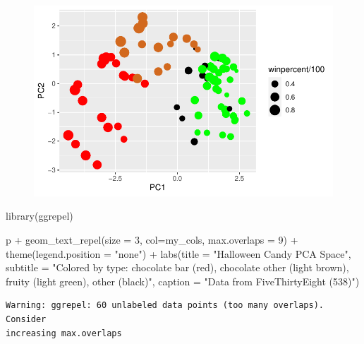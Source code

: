 \documentclass[
  letterpaper,
  DIV=11,
  numbers=noendperiod]{scrartcl}
\newenvironment{Shaded}{\begin{snugshade}}{\end{snugshade}}
\newcommand{\AttributeTok}[1]{\textcolor[rgb]{0.40,0.45,0.13}{#1}}
\newcommand{\DecValTok}[1]{\textcolor[rgb]{0.68,0.00,0.00}{#1}}
\newcommand{\FunctionTok}[1]{\textcolor[rgb]{0.28,0.35,0.67}{#1}}
\newcommand{\NormalTok}[1]{\textcolor[rgb]{0.00,0.23,0.31}{#1}}
\newcommand{\SpecialCharTok}[1]{\textcolor[rgb]{0.37,0.37,0.37}{#1}}
\newcommand{\StringTok}[1]{\textcolor[rgb]{0.13,0.47,0.30}{#1}}
\begin{document}
\begin{figure}[H]

{\centering \includegraphics{class10_files/figure-pdf/unnamed-chunk-32-1.pdf}

}

\end{figure}

\begin{Shaded}
\begin{Highlighting}[]
\FunctionTok{library}\NormalTok{(ggrepel)}

\NormalTok{p }\SpecialCharTok{+} \FunctionTok{geom\_text\_repel}\NormalTok{(}\AttributeTok{size =} \DecValTok{3}\NormalTok{, }\AttributeTok{col=}\NormalTok{my\_cols, }\AttributeTok{max.overlaps =} \DecValTok{9}\NormalTok{)  }\SpecialCharTok{+} 
  \FunctionTok{theme}\NormalTok{(}\AttributeTok{legend.position =} \StringTok{"none"}\NormalTok{) }\SpecialCharTok{+}
  \FunctionTok{labs}\NormalTok{(}\AttributeTok{title =} \StringTok{"Halloween Candy PCA Space"}\NormalTok{,}
       \AttributeTok{subtitle =} \StringTok{"Colored by type: chocolate bar (red),}
\StringTok{       chocolate other (light brown),}
\StringTok{       fruity (light green),}
\StringTok{       other (black)"}\NormalTok{,}
       \AttributeTok{caption =} \StringTok{"Data from FiveThirtyEight (538)"}\NormalTok{)}
\end{Highlighting}
\end{Shaded}

\begin{verbatim}
Warning: ggrepel: 60 unlabeled data points (too many overlaps). Consider
increasing max.overlaps
\end{verbatim}
\end{document}
